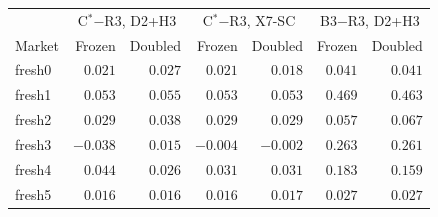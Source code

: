 \begin{tabular}{@{}lrrrrrr@{}}\toprule
 & \multicolumn{2}{c}{C$^*$$-$R3, D2+H3} & \multicolumn{2}{c}{C$^*$$-$R3, X7-SC} & \multicolumn{2}{c}{B3$-$R3, D2+H3} \\
Market & Frozen & Doubled & Frozen & Doubled & Frozen & Doubled \\\midrule
fresh0 & $0.021$ & $0.027$ & $0.021$ & $0.018$ & $0.041$ & $0.041$ \\
fresh1 & $0.053$ & $0.055$ & $0.053$ & $0.053$ & $0.469$ & $0.463$ \\
fresh2 & $0.029$ & $0.038$ & $0.029$ & $0.029$ & $0.057$ & $0.067$ \\
fresh3 & $-0.038$ & $0.015$ & $-0.004$ & $-0.002$ & $0.263$ & $0.261$ \\
fresh4 & $0.044$ & $0.026$ & $0.031$ & $0.031$ & $0.183$ & $0.159$ \\
fresh5 & $0.016$ & $0.016$ & $0.016$ & $0.017$ & $0.027$ & $0.027$ \\
\bottomrule\end{tabular}
